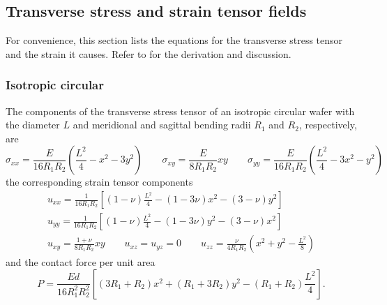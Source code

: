 \documentclass[11pt,a4paper]{article}
\begin{document}
\subsection{Transverse stress and strain tensor fields \label{sec:deformations}}
For convenience, this section lists the equations for the transverse stress tensor and the strain it causes. Refer to \cite{honkanen2020} for the derivation and discussion.
\subsubsection{Isotropic circular}
The components of the transverse stress tensor of an isotropic circular wafer with the diameter $L$ and meridional and sagittal bending radii $R_1$ and $R_2$, respectively, are
\begin{equation}
\sigma_{xx} =  \frac{E}{16 R_1 R_2}\left( \frac{L^2}{4} - x^2 - 3 y^2 \right) \qquad
\sigma_{xy} = \frac{E}{8 R_1 R_2}x y \qquad
\sigma_{yy} =  \frac{E}{16 R_1 R_2}\left(\frac{L^2}{4} - 3 x^2 - y^2\right)
\end{equation}
the corresponding strain tensor components
\begin{gather}
u_{xx} = \frac{1}{16 R_1 R_2}\left[(1-\nu)\frac{L^2}{4} - (1-3\nu)x^2 - (3-\nu)y^2 \right] \\
u_{yy} = \frac{1}{16 R_1 R_2}\left[(1-\nu)\frac{L^2}{4} - (1-3\nu)y^2 - (3-\nu)x^2 \right] \\
u_{xy} = \frac{1+\nu}{8 R_1 R_2}x y \qquad u_{xz} = u_{yz} = 0 \qquad
u_{zz} = \frac{\nu}{4 R_1 R_2}\left(x^2 + y^2 -\frac{L^2}{8} \right)
\end{gather}
and the contact force per unit area
\begin{equation}
P = \frac{E d}{16 R_1^2 R_2^2} \left[ 
\left(3 R_1 + R_2 \right) x^2
+ \left(R_1 + 3 R_2 \right) y^2
- \left(R_1 + R_2 \right)\frac{L^2}{4}
\right].
\end{equation}
\end{document}
